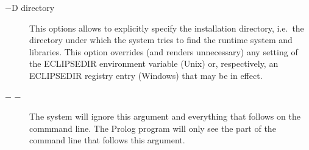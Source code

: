 \begin{description}
\item[$-$D directory] 
This options allows to explicitly specify the {\eclipse} installation
directory, i.e.\ the directory under which the system tries to find
the {\eclipse} runtime system and libraries.  This option overrides
(and renders unnecessary) any setting of the ECLIPSEDIR environment
variable (Unix) or, respectively, an ECLIPSEDIR registry entry
(Windows) that may be in effect.

\item[$-$ $-$]
The {\eclipse} system will ignore this argument and everything that follows on
the commmand line. The Prolog program will only see the part of the
command line that follows this argument.
\end{description}


